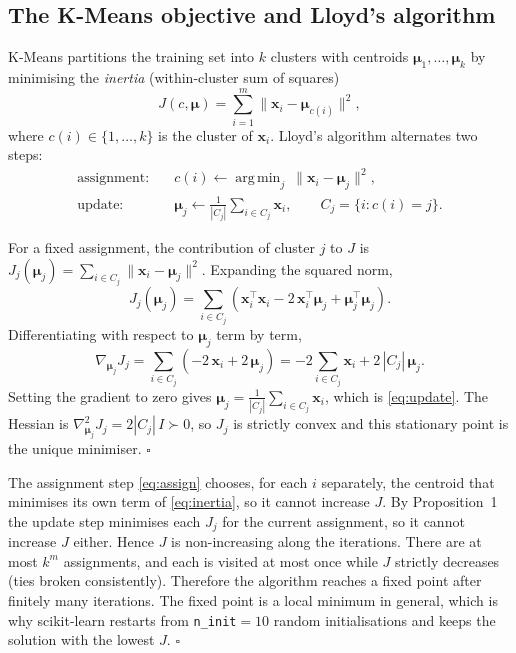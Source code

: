 \documentclass[11pt,a4paper]{article}
\newcommand{\x}{\mathbf{x}}
\newcommand{\vmu}{\boldsymbol{\mu}}
\DeclareMathOperator*{\argmin}{arg\,min}
\begin{document}
\subsection{The K-Means objective and Lloyd's algorithm}
K-Means partitions the training set into $k$ clusters with centroids $\vmu_1,\dots,\vmu_k$ by minimising the
\emph{inertia} (within-cluster sum of squares)
\begin{equation}\label{eq:inertia}
  J(c,\vmu) = \sum_{i=1}^{m} \bigl\lVert \x_i - \vmu_{c(i)} \bigr\rVert^2,
\end{equation}
where $c(i)\in\{1,\dots,k\}$ is the cluster of $\x_i$. Lloyd's algorithm alternates two steps:
\begin{align}
  \text{assignment:}\quad & c(i) \leftarrow \argmin_{j}\ \lVert \x_i - \vmu_j \rVert^2, \label{eq:assign}\\
  \text{update:}\quad & \vmu_j \leftarrow \frac{1}{|C_j|}\sum_{i\in C_j}\x_i,\qquad C_j=\{i : c(i)=j\}. \label{eq:update}
\end{align}

\begin{proofbox}
For a fixed assignment, the contribution of cluster $j$ to $J$ is
$J_j(\vmu_j)=\sum_{i\in C_j}\lVert\x_i-\vmu_j\rVert^2$. Expanding the squared norm,
\begin{equation*}
  J_j(\vmu_j)=\sum_{i\in C_j}\left(\x_i^\top\x_i-2\,\x_i^\top\vmu_j+\vmu_j^\top\vmu_j\right).
\end{equation*}
Differentiating with respect to $\vmu_j$ term by term,
\begin{equation*}
  \nabla_{\vmu_j}J_j=\sum_{i\in C_j}\left(-2\,\x_i+2\,\vmu_j\right)=-2\sum_{i\in C_j}\x_i+2\,|C_j|\,\vmu_j .
\end{equation*}
Setting the gradient to zero gives $\vmu_j=\frac{1}{|C_j|}\sum_{i\in C_j}\x_i$, which is \eqref{eq:update}.
The Hessian is $\nabla^2_{\vmu_j}J_j=2|C_j|\,I\succ 0$, so $J_j$ is strictly convex and this stationary point is the
unique minimiser. \hfill$\square$
\end{proofbox}

\begin{proofbox}
The assignment step \eqref{eq:assign} chooses, for each $i$ separately, the centroid that minimises its own term
of \eqref{eq:inertia}, so it cannot increase $J$. By Proposition~1 the update step minimises each $J_j$ for the
current assignment, so it cannot increase $J$ either. Hence $J$ is non-increasing along the iterations. There are
at most $k^m$ assignments, and each is visited at most once while $J$ strictly decreases (ties broken
consistently). Therefore the algorithm reaches a fixed point after finitely many iterations. The fixed point is a
local minimum in general, which is why scikit-learn restarts from \texttt{n\_init}$=10$ random initialisations and
keeps the solution with the lowest $J$. \hfill$\square$
\end{proofbox}
\end{document}
